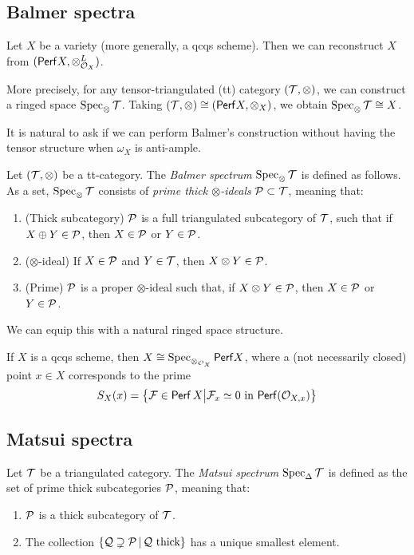 \documentclass{amsart}
\begin{document}
\subsection{Balmer spectra}

\begin{thm}[Balmer]
	Let $X$ be a variety (more generally, a qcqs scheme).
	Then we can reconstruct $X$ from $(\mathsf{Perf} X, \otimes_{\mathcal{O}_X}^L)$.
	
	More precisely, for any tensor-triangulated (tt) category $(\mathcal{T}, \otimes)$, we can construct a ringed space $\operatorname{Spec}_\otimes \mathcal{T}$.
	Taking $(\mathcal{T}, \otimes) \cong (\mathsf{Perf} X, \otimes_X)$, we obtain $\operatorname{Spec}_\otimes \mathcal{T} \cong X$.
\end{thm}

It is natural to ask if we can perform Balmer's construction without having the tensor structure when $\omega_X$ is anti-ample.


\begin{dfn}[Balmer]
	Let $(\mathcal{T}, \otimes)$ be a tt-category.
	The \emph{Balmer spectrum} $\operatorname{Spec}_\otimes \mathcal{T}$ is defined as follows.
	As a set, $\operatorname{Spec}_\otimes \mathcal{T}$ consists of \emph{prime thick $\otimes$-ideals} $\mathcal{P} \subset \mathcal{T}$, meaning that:
	\begin{enumerate}
		\item (Thick subcategory) $\mathcal{P}$ is a full triangulated subcategory of $\mathcal{T}$, such that if $X \oplus Y \in \mathcal{P}$, then $X \in \mathcal{P}$ or $Y \in \mathcal{P}$.
		\item ($\otimes$-ideal) If $X \in \mathcal{P}$ and $Y \in \mathcal{T}$, then $X \otimes Y \in \mathcal{P}$.
		\item (Prime) $\mathcal{P}$ is a proper $\otimes$-ideal such that, if $X \otimes Y \in \mathcal{P}$, then $X \in \mathcal{P}$ or $Y \in \mathcal{P}$.
	\end{enumerate}
	We can equip this with a natural ringed space structure.
\end{dfn}

\begin{ex}
	If $X$ is a qcqs scheme, then $X \cong \operatorname{Spec}_{\otimes_{\mathcal{O}_X}} \mathsf{Perf} X$, where a (not necessarily closed) point $x \in X$ corresponds to the prime
	\[
		S_X(x) = \big\{ \mathcal{F} \in \mathsf{Perf}\, X \big| \mathcal{F}_x \simeq 0 \textrm{ in } \mathsf{Perf}(\mathcal{O}_{X,x}) \big\}
	\]
\end{ex}

\subsection{Matsui spectra}

\begin{dfn}[Matsui]
	Let $\mathcal{T}$ be a triangulated category.
	The \emph{Matsui spectrum} $\operatorname{Spec}_\Delta \mathcal{T}$ is defined as the set of prime thick subcategories $\mathcal{P}$, meaning that:
	\begin{enumerate}
		\item $\mathcal{P}$ is a thick subcategory of $\mathcal{T}$.
		\item The collection $\{ \mathcal{Q} \supsetneq \mathcal{P} \,|\, \mathcal{Q} \textrm{ thick}\}$ has a unique smallest element.
	\end{enumerate}
\end{dfn}
\end{document}
